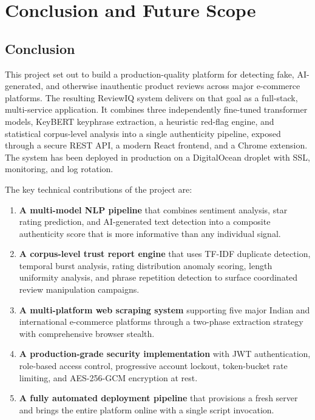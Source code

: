 \documentclass[12pt,a4paper,oneside]{report}
\begin{document}
\chapter{Conclusion and Future Scope}

\section{Conclusion}
This project set out to build a production-quality platform for
detecting fake, AI-generated, and otherwise inauthentic product reviews
across major e-commerce platforms. The resulting ReviewIQ system
delivers on that goal as a full-stack, multi-service application. It
combines three independently fine-tuned transformer models, KeyBERT
keyphrase extraction, a heuristic red-flag engine, and statistical
corpus-level analysis into a single authenticity pipeline, exposed
through a secure REST API, a modern React frontend, and a Chrome
extension. The system has been deployed in production on a
DigitalOcean droplet with SSL, monitoring, and log rotation.

The key technical contributions of the project are:

\begin{enumerate}[leftmargin=*]
  \item \textbf{A multi-model NLP pipeline} that combines sentiment
        analysis, star rating prediction, and AI-generated text detection
        into a composite authenticity score that is more informative than
        any individual signal.
  \item \textbf{A corpus-level trust report engine} that uses TF-IDF
        duplicate detection, temporal burst analysis, rating distribution
        anomaly scoring, length uniformity analysis, and phrase repetition
        detection to surface coordinated review manipulation campaigns.
  \item \textbf{A multi-platform web scraping system} supporting five
        major Indian and international e-commerce platforms through a
        two-phase extraction strategy with comprehensive browser stealth.
  \item \textbf{A production-grade security implementation} with JWT
        authentication, role-based access control, progressive account
        lockout, token-bucket rate limiting, and AES-256-GCM encryption
        at rest.
  \item \textbf{A fully automated deployment pipeline} that provisions
        a fresh server and brings the entire platform online with a single
        script invocation.
\end{enumerate}
\end{document}
